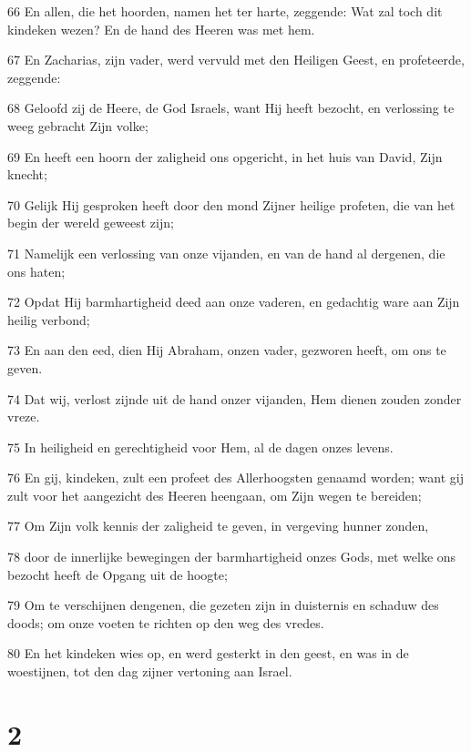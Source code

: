 \par 66 En allen, die het hoorden, namen het ter harte, zeggende: Wat zal toch dit kindeken wezen? En de hand des Heeren was met hem.
\par 67 En Zacharias, zijn vader, werd vervuld met den Heiligen Geest, en profeteerde, zeggende:
\par 68 Geloofd zij de Heere, de God Israels, want Hij heeft bezocht, en verlossing te weeg gebracht Zijn volke;
\par 69 En heeft een hoorn der zaligheid ons opgericht, in het huis van David, Zijn knecht;
\par 70 Gelijk Hij gesproken heeft door den mond Zijner heilige profeten, die van het begin der wereld geweest zijn;
\par 71 Namelijk een verlossing van onze vijanden, en van de hand al dergenen, die ons haten;
\par 72 Opdat Hij barmhartigheid deed aan onze vaderen, en gedachtig ware aan Zijn heilig verbond;
\par 73 En aan den eed, dien Hij Abraham, onzen vader, gezworen heeft, om ons te geven.
\par 74 Dat wij, verlost zijnde uit de hand onzer vijanden, Hem dienen zouden zonder vreze.
\par 75 In heiligheid en gerechtigheid voor Hem, al de dagen onzes levens.
\par 76 En gij, kindeken, zult een profeet des Allerhoogsten genaamd worden; want gij zult voor het aangezicht des Heeren heengaan, om Zijn wegen te bereiden;
\par 77 Om Zijn volk kennis der zaligheid te geven, in vergeving hunner zonden,
\par 78 door de innerlijke bewegingen der barmhartigheid onzes Gods, met welke ons bezocht heeft de Opgang uit de hoogte;
\par 79 Om te verschijnen dengenen, die gezeten zijn in duisternis en schaduw des doods; om onze voeten te richten op den weg des vredes.
\par 80 En het kindeken wies op, en werd gesterkt in den geest, en was in de woestijnen, tot den dag zijner vertoning aan Israel.

\chapter{2}


